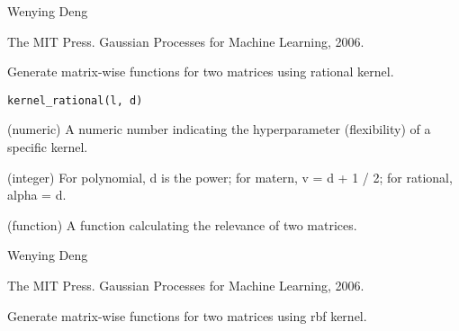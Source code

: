 \documentclass[a4paper]{book}
\begin{document}
%
\begin{Author}\relax
Wenying Deng
\end{Author}
%
\begin{References}\relax
The MIT Press. Gaussian Processes for Machine Learning, 2006.
\end{References}
%
\begin{Description}\relax
Generate matrix-wise functions for two matrices using rational kernel.
\end{Description}
%
\begin{Usage}
\begin{verbatim}
kernel_rational(l, d)
\end{verbatim}
\end{Usage}
%
\begin{Arguments}
\begin{ldescription}
\item[\code{l}] (numeric) A numeric number indicating the hyperparameter
(flexibility) of a specific kernel.

\item[\code{d}] (integer) For polynomial, d is the power; for matern, v = d + 1 /
2; for rational, alpha = d.
\end{ldescription}
\end{Arguments}
%
\begin{Details}\relax
{} 
\end{Details}
%
\begin{Value}
\begin{ldescription}
\item[\code{matrix\_wise}] (function) A function calculating the relevance
of two matrices.
\end{ldescription}
\end{Value}
%
\begin{Author}\relax
Wenying Deng
\end{Author}
%
\begin{References}\relax
The MIT Press. Gaussian Processes for Machine Learning, 2006.
\end{References}
%
\begin{Description}\relax
Generate matrix-wise functions for two matrices using rbf kernel.
\end{Description}
\end{document}
